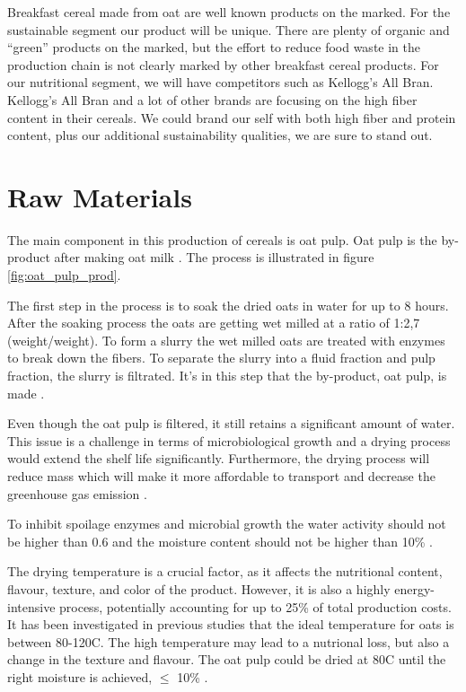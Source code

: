\vline

Breakfast cereal made from oat are well known products on the marked. For the sustainable segment our product will be unique. There are plenty of organic and “green” products on the marked, but the effort to reduce food waste in the production chain is not clearly marked by other breakfast cereal products. For our nutritional segment, we will have competitors such as Kellogg's All Bran. Kellogg's All Bran and a lot of other brands are focusing on the high fiber content in their cereals. We could brand our self with both high fiber and protein content, plus our additional sustainability qualities, we are sure to stand out.  

\section{Raw Materials}
The main component in this production of cereals is oat pulp. Oat pulp is the by-product after making oat milk \cite*{05_article}. The process is illustrated in figure \ref*{fig:oat_pulp_prod}.

\vline

The first step in the process is to soak the dried oats in water for up to 8 hours. After the soaking process the oats are getting wet milled at a ratio of 1:2,7 (weight/weight). To form a slurry the wet milled oats are treated with enzymes to break down the fibers. To separate the slurry into a fluid fraction and pulp fraction, the slurry is filtrated. It's in this step that the by-product, oat pulp, is made \cite*{05_article}.

\vline

Even though the oat pulp is filtered, it still retains a significant amount of water. This issue is a challenge in terms of microbiological growth and a drying process would extend the shelf life significantly. Furthermore, the drying process will reduce mass which will make it more affordable to transport and decrease the greenhouse gas emission \cite*{05_article}.

\vline

To inhibit spoilage enzymes and microbial growth the water activity should not be higher than 0.6 and the moisture content should not be higher than 10\% \cite*{05_article}.

\vline

The drying temperature is a crucial factor, as it affects the nutritional content, flavour, texture, and color of the product. However, it is also a highly energy-intensive process, potentially accounting for up to 25\% of total production costs. It has been investigated in previous studies that the ideal temperature for oats is between 80-120\textdegree C. The high temperature may lead to a nutrional loss, but also a change in the texture and flavour. The oat pulp could be dried at 80\textdegree C until the right moisture is achieved, $\leq$ 10\% \cite*{05_article}.

